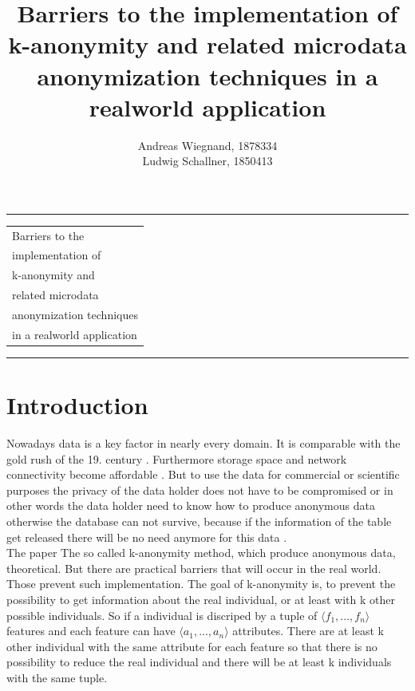 \documentclass{llncs}
\begin{document}
\thispagestyle{empty}
\rule{\textwidth}{1pt}
\vspace{2pt}
\begin{flushright}
\Huge
\begin{tabular}{@{}l}
Barriers to the\\
implementation of\\
k-anonymity and\\
related microdata\\
anonymization techniques\\
in a realworld application\\[6pt]

\end{tabular}
\end{flushright}
\rule{\textwidth}{1pt}
\vfill
\title{Barriers to the implementation of k-anonymity and related microdata anonymization techniques in a realworld application}
\author{Andreas Wiegnand, 1878334\\
	Ludwig Schallner, 1850413}
\institute{}
\maketitle
%
\newpage
\setcounter{page}{1}
\section{Introduction}
%
Nowadays data is a key factor in nearly every domain. It is comparable with the gold rush of the 19. century \cite{datarevo}. Furthermore storage space and network connectivity become affordable \cite{sweeney2002k}. But to use the data for commercial or scientific purposes the privacy of the data holder does not have to be compromised or in other words the data holder need to know how to produce anonymous data otherwise the database can not survive, because if the information of the table get released there will be no need anymore for this data \cite{sweeney2002k}.\\

The paper The so called k-anonymity method, which produce anonymous data, theoretical. But there are practical barriers that will occur in the real world. Those prevent such implementation. The goal of k-anonymity is, to prevent the possibility to get information about the real individual, or at least with k other possible individuals. So if a individual is discriped by a tuple of \ensuremath{\langle f_1, ... ,f_n \rangle} features and each feature can have \ensuremath{\langle a_1,...,a_n \rangle} attributes. There are at least k other individual with the same attribute for each feature so that there is no possibility to reduce the real individual and there will be at least k individuals with the same tuple\cite{sweeney2002k}.\\
\end{document}
